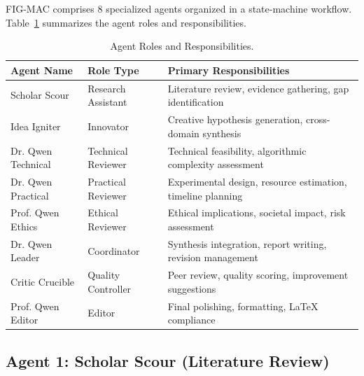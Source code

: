 \documentclass[runningheads]{llncs}
\begin{document}
FIG-MAC comprises 8 specialized agents organized in a state-machine workflow. Table~\ref{tab:agent_roles} summarizes the agent roles and responsibilities.

\begin{table}[h]
\centering
\small
\begin{tabular}{llp{6cm}}
\toprule
\textbf{Agent Name} & \textbf{Role Type} & \textbf{Primary Responsibilities} \\
\midrule
Scholar Scour & Research Assistant & Literature review, evidence gathering, gap identification \\
Idea Igniter & Innovator & Creative hypothesis generation, cross-domain synthesis \\
Dr. Qwen Technical & Technical Reviewer & Technical feasibility, algorithmic complexity assessment \\
Dr. Qwen Practical & Practical Reviewer & Experimental design, resource estimation, timeline planning \\
Prof. Qwen Ethics & Ethical Reviewer & Ethical implications, societal impact, risk assessment \\
Dr. Qwen Leader & Coordinator & Synthesis integration, report writing, revision management \\
Critic Crucible & Quality Controller & Peer review, quality scoring, improvement suggestions \\
Prof. Qwen Editor & Editor & Final polishing, formatting, LaTeX compliance \\
\bottomrule
\end{tabular}
\caption{Agent Roles and Responsibilities.}
\label{tab:agent_roles}
\end{table}

\subsection{Agent 1: Scholar Scour (Literature Review)}
\end{document}
